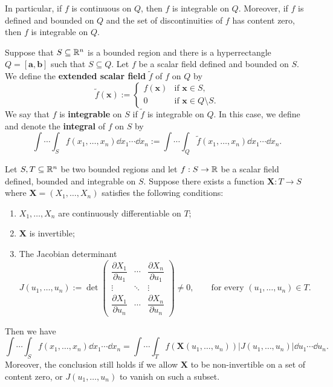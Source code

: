 \begin{remarkenv}
    In particular, if $f$ is continuous on $Q$, then $f$ is integrable on $Q$. Moreover, if $f$ is defined and bounded on $Q$ and the set of discontinuities of $f$ has content zero, then $f$ is integrable on $Q$.
\end{remarkenv}
\begin{definitionenv}
    Suppose that $S\subseteq \mathbb{R}^n$ is a bounded region and there is a hyperrectangle $Q = [\bm a, \bm b]$ such that $S \subseteq Q$. Let $f$ be a scalar field defined and bounded on $S$. We define the \textbf{extended scalar field} $\widetilde f$ of $f$ on $Q$ by
    $$
    \widetilde f(\bm x) := \begin{cases}
        f(\bm x) & \text{if } \bm x \in S, \\
        0 & \text{if } \bm x \in Q \setminus S.
    \end{cases}
    $$
    We say that $f$ is \textbf{integrable} on $S$ if $\widetilde f$ is integrable on $Q$. In this case, we define and denote the \textbf{integral} of $f$ on $S$ by
    $$
    \int \cdots \int_S f(x_1, \ldots, x_n) \dd x_1 \cdots \dd x_n := \int \cdots \int_Q \widetilde f(x_1, \ldots, x_n) \dd x_1 \cdots \dd x_n.
    $$
\end{definitionenv}
\begin{theoremenv}
    Let $S,T \subseteq \mathbb{R}^n$ be two bounded regions and let $f: S \to \mathbb{R}$ be a scalar field defined, bounded and integrable on $S$. Suppose there exists a function $\bm X: T \to S$ where $\bm X = (X_1, \ldots, X_n)$ satisfies the following conditions:
    \begin{enumerate}[label=(\arabic*)]
        \item $X_1, \ldots, X_n$ are continuously differentiable on $T$;
        \item $\bm X$ is invertible;
        \item The Jacobian determinant
        $$ J(u_1, \ldots, u_n) := \det \begin{pmatrix} \dfrac{\partial X_1}{\partial u_1} & \cdots & \dfrac{\partial X_n}{\partial u_1}\\[6pt] \vdots & \ddots & \vdots\\[6pt] \dfrac{\partial X_1}{\partial u_n} & \cdots & \dfrac{\partial X_n}{\partial u_n} \end{pmatrix} \ne 0,\qquad \text{for every } (u_1, \ldots, u_n) \in T. $$
    \end{enumerate}
    Then we have
    $$ \int \cdots \int_S f(x_1, \ldots, x_n) \dd x_1 \cdots \dd x_n = \int \cdots \int_T f(\bm X(u_1, \ldots, u_n)) |J(u_1, \ldots, u_n)| \dd u_1 \cdots \dd u_n. $$
    Moreover, the conclusion still holds if we allow $\bm X$ to be non-invertible on a set of content zero, or $J(u_1, \ldots, u_n)$ to vanish on such a subset.
\end{theoremenv}
